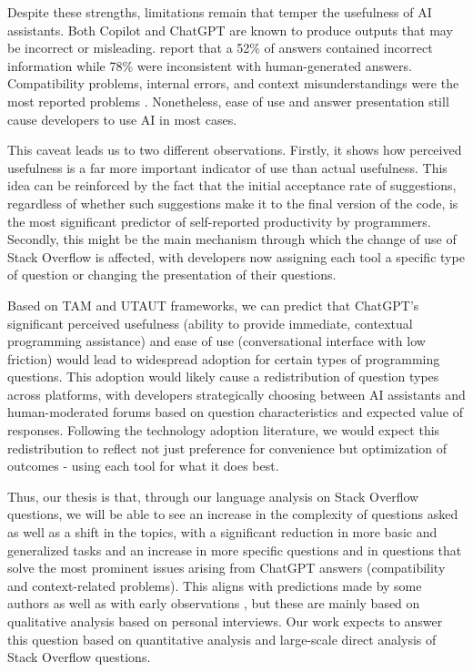 Despite these strengths, limitations remain that temper the usefulness of AI assistants. Both Copilot and ChatGPT are known to produce outputs that may be incorrect or misleading. \textcite{kabir_is_2023} report that a 52\% of answers contained incorrect information  while 78\% were inconsistent with human-generated answers. Compatibility problems, internal errors, and context misunderstandings were the most reported problems \parencite{zhou_exploring_2025}. Nonetheless, ease of use and answer presentation still cause developers to use AI in most cases.

This caveat leads us to two different observations. Firstly, it shows how perceived usefulness is a far more important indicator of use than actual usefulness. This idea can be reinforced by the fact that the initial acceptance rate of suggestions, regardless of whether such suggestions make it to the final version of the code, is the most significant predictor of self-reported productivity by programmers. Secondly, this might be the main mechanism through which the change of use of Stack Overflow is affected, with developers now assigning each tool a specific type of question or changing the presentation of their questions.

Based on TAM and UTAUT frameworks, we can predict that ChatGPT's significant perceived usefulness (ability to provide immediate, contextual programming assistance) and ease of use (conversational interface with low friction) would lead to widespread adoption for certain types of programming questions. This adoption would likely cause a redistribution of question types across platforms, with developers strategically choosing between AI assistants and human-moderated forums based on question characteristics and expected value of responses. Following the technology adoption literature, we would expect this redistribution to reflect not just preference for convenience but optimization of outcomes - using each tool for what it does best.

Thus, our thesis is that, through our language analysis on Stack Overflow questions, we will be able to see an increase in the complexity of questions asked as well as a shift in the topics, with a significant reduction in more basic and generalized tasks and an increase in more specific questions and in questions that solve the most prominent issues arising from ChatGPT answers (compatibility and context-related problems). This aligns with predictions made by some authors as well as with early observations \parencite{kabir_is_2023, sergeyuk_using_2025, zhou_exploring_2025}, but these are mainly based on qualitative analysis based on personal interviews. Our work expects to answer this question based on quantitative analysis and large-scale direct analysis of Stack Overflow questions.